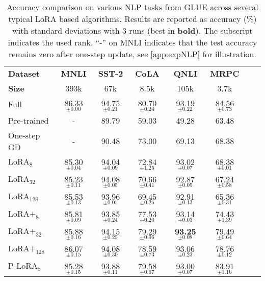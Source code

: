 \begin{table*}[t]
\centering
\caption{Accuracy comparison on various NLP tasks from GLUE across several typical LoRA based algorithms. Results are reported as accuracy (\%) with standard deviations with 3 runs (best in {\bf bold}). The subscript indicates the used rank. ``-'' on MNLI indicates that the test accuracy remains zero after one-step update, see \cref{app:expNLP} for illustration.}
\label{tab:nlu-performance}
\begin{tabular}{lccccccc}
\toprule
\textbf{Dataset} & \textbf{MNLI} & \textbf{SST-2} & \textbf{CoLA} & \textbf{QNLI} & \textbf{MRPC}  \\
\textbf{Size}              & 393k          & 67k            & 8.5k          & 105k          & 3.7k                \\
\midrule
Full          & 86.33$_{\pm0.00}$ & 94.75$_{\pm0.21}$ & 80.70$_{\pm0.24}$ & 93.19$_{\pm0.22}$ & 84.56$_{\pm0.73}$ \\
\midrule
Pre-trained & - & 89.79 & 59.03 & 49.28 & 63.48 \\
One-step GD & - & 90.48 & 73.00 & 69.13 & 68.38\\
\midrule
$\text{LoRA}_{8}$         & 85.30$_{\pm0.04}$ & 94.04$_{\pm0.09}$ & 72.84$_{\pm 1.25}$ & 93.02$_{\pm0.07}$ & 68.38$_{\pm0.01}$ \\
$\text{LoRA}_{32}$        &        85.23$_{\pm 0.11}$           &   94.08$_{\pm 0.05}$       &  70.66$_{\pm 0.41}$         &    92.87$_{\pm 0.05}$       &   67.24$_{\pm 0.58}$   \\
$\text{LoRA}_{128}$        &    85.53$_{\pm 0.13}$      &     93.96$_{\pm 0.05}$        &     69.45$_{\pm 0.25}$       &     92.91$_{\pm 0.13}$        &    65.36$_{\pm 0.31}$    \\
\midrule
$\text{LoRA+}_{8}$      & 85.81$_{\pm0.09}$ & 93.85$_{\pm0.24}$ & 77.53$_{\pm0.20}$ & 93.14$_{\pm0.03}$ & 74.43$_{\pm1.39}$  \\
$\text{LoRA+}_{32}$        &   85.88$_{\pm 0.16}$      &      94.15$_{\pm 0.25}$     &      79.29$_{\pm 0.96}$      &      \textbf{93.25}$_{\pm 0.08}$     &   79.49$_{\pm 0.64}$  \\
$\text{LoRA+}_{128}$        &    86.07$_{\pm 0.15}$       &    94.08$_{\pm 0.30}$      &     78.59$_{\pm 0.73}$     &   93.06$_{\pm 0.23}$       &    78.76$_{\pm 0.12}$    \\
\midrule
$\text{P-LoRA}_{8}$        &    85.28$_{\pm 0.15}$   &      93.88$_{\pm 0.11}$      &    79.58$_{\pm 0.67}$      &     93.00$_{\pm 0.07}$     &    83.91$_{\pm 1.16}$    \\

\end{tabular}
\end{table*}
